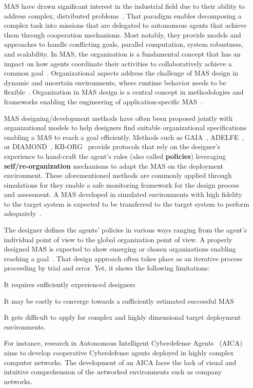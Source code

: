 \documentclass[runningheads]{llncs}
\begin{document}
MAS have drawn significant interest in the industrial field due to their ability to address complex, distributed problems~\cite{Raileanu2023}.
That paradigm enables decomposing a complex task into missions that are delegated to autonomous agents that achieve them through cooperation mechanisms. Most notably, they provide models and approaches to handle conflicting goals, parallel computation, system robustness, and scalability.
In MAS, the organization is a fundamental concept that has an impact on how agents coordinate their activities to collaboratively achieve a common goal~\cite{Hubner2007}.
Organizational aspects address the challenge of MAS design in dynamic and uncertain environments, where runtime behavior needs to be flexible~\cite{Kathleen2020}. Organization in MAS design is a central concept in methodologies and frameworks enabling the engineering of application-specific MAS~\cite{Bakliwal2018}.

MAS designing/development methods have often been proposed jointly with organizational models to help designers find suitable organizational specifications enabling a MAS to reach a goal efficiently. Methods such as GAIA~\cite{Wooldridge2000,Cernuzzi2014}, ADELFE~\cite{Mefteh2015}, or DIAMOND~\cite{Jamont2015}, KB-ORG~\cite{Sims2008} provide protocols that rely on the designer's experience to hand-craft the agent's rules (also called \textbf{policies}) leveraging \textbf{self/re-organization} mechanisms to adapt the MAS on the deployment environment.
These aforementioned methods are commonly applied through simulations for they enable a safe monitoring framework for the design process and assessment. A MAS developed in simulated environments with high fidelity to the target system is expected to be transferred to the target system to perform adequately~\cite{Schon2021}.

The designer defines the agents' policies in various ways ranging from the agent's individual point of view to the global organization point of view. A properly designed MAS is expected to show emerging or chosen organizations enabling reaching a goal~\cite{Picard2009}. That design approach often takes place as an iterative process proceeding by trial and error. Yet, it shows the following limitations:
\begin{enumerate*}[label=\roman*),itemjoin={;\quad}]
    \item It requires sufficiently experienced designers
    \item It may be costly to converge towards a sufficiently estimated successful MAS
    \item It gets difficult to apply for complex and highly dimensional target deployment environments.
\end{enumerate*}
For instance, research in Autonomous Intelligent Cyberdefense Agents~\cite{Kott2023} (AICA) aims to develop cooperative Cyberdefense agents deployed in highly complex computer networks. The development of an AICA faces the lack of visual and intuitive comprehension of the networked environments such as company networks.
\end{document}
